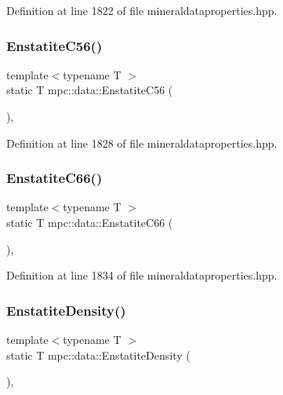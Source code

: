 Definition at line 1822 of file mineraldataproperties.\+hpp.

\mbox{\label{namespacempc_1_1data_abf3ee91245d7fc44fc0295e256b8577b}} 
\subsubsection{\texorpdfstring{Enstatite\+C56()}{EnstatiteC56()}}
{\footnotesize\ttfamily template$<$typename T $>$ \\
static T mpc\+::data\+::\+Enstatite\+C56 (\begin{DoxyParamCaption}{ }\end{DoxyParamCaption})\hspace{0.3cm}{\ttfamily [inline]}, {\ttfamily [static]}}



Definition at line 1828 of file mineraldataproperties.\+hpp.

\mbox{\label{namespacempc_1_1data_a25d90ccb5769ec96e25b6b73b5d35fc2}} 
\subsubsection{\texorpdfstring{Enstatite\+C66()}{EnstatiteC66()}}
{\footnotesize\ttfamily template$<$typename T $>$ \\
static T mpc\+::data\+::\+Enstatite\+C66 (\begin{DoxyParamCaption}{ }\end{DoxyParamCaption})\hspace{0.3cm}{\ttfamily [inline]}, {\ttfamily [static]}}



Definition at line 1834 of file mineraldataproperties.\+hpp.

\mbox{\label{namespacempc_1_1data_ab8b786f26e65861726f33131c27c48c7}} 
\subsubsection{\texorpdfstring{Enstatite\+Density()}{EnstatiteDensity()}}
{\footnotesize\ttfamily template$<$typename T $>$ \\
static T mpc\+::data\+::\+Enstatite\+Density (\begin{DoxyParamCaption}{ }\end{DoxyParamCaption})\hspace{0.3cm}{\ttfamily [inline]}, {\ttfamily [static]}}



